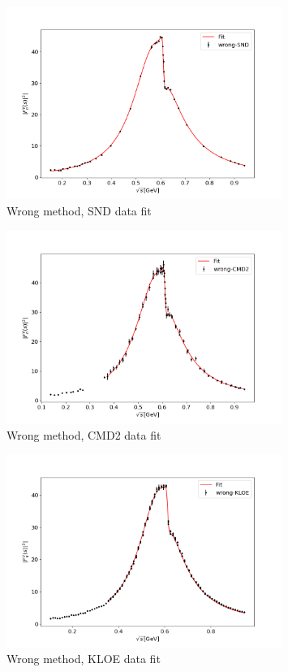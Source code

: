 \documentclass[a4paper]{article}
\begin{document}
\begin{figure}[H]
    \centering
    \includegraphics[width=0.8\textwidth]{./plots/wrong-SND.png}
    \caption{Wrong method, SND data fit\label{fig12}}
\end{figure}
\begin{figure}[H]
    \centering
    \includegraphics[width=0.8\textwidth]{./plots/wrong-CMD2.png}
    \caption{Wrong method, CMD2 data fit\label{fig13}}
\end{figure}
\begin{figure}[H]
    \centering
    \includegraphics[width=0.8\textwidth]{./plots/wrong-KLOE.png}
    \caption{Wrong method, KLOE data fit\label{fig14}}
\end{figure}
\end{document}
